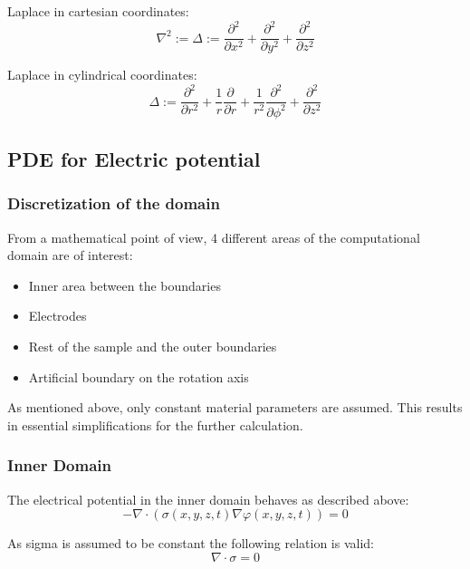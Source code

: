 \documentclass[parskip=half, titlepage=yes, 12pt, BCOR=12mm, DIV=calc]{scrartcl}
\begin{document}
Laplace in cartesian coordinates:
\begin{equation}
    \nabla^2 := \Delta := \frac{\partial^2}{\partial x^2} + \frac{\partial^2}{\partial y^2} + \frac{\partial^2}{\partial z^2}
\end{equation}

Laplace in cylindrical coordinates:
\begin{equation}
    \Delta := \frac{\partial^2}{\partial r^2} + \frac{1}{r} \frac{\partial}{\partial r} + \frac{1}{r^2} \frac{\partial^2}{\partial \phi^2} + \frac{\partial^2}{\partial z^2}
\end{equation}



\subsection{PDE for Electric potential}

\subsubsection{Discretization of the domain}

From a mathematical point of view, 4 different areas of the computational domain are of interest:
\begin{itemize}
    \item Inner area between the boundaries
    \item Electrodes 
    \item Rest of the sample and the outer boundaries
    \item Artificial boundary on the rotation axis
\end{itemize}

As mentioned above, only constant material parameters are assumed. This results in essential simplifications for the further calculation.

\subsubsection{Inner Domain}

The electrical potential in the inner domain behaves as described above:
\begin{equation}
    - \nabla \cdot (\sigma(x,y,z,t) \nabla \varphi(x,y,z,t)) = 0
\end{equation}

As sigma is assumed to be constant the following relation is valid:
\begin{equation}
    \nabla \cdot \sigma = 0
\end{equation}
\end{document}
